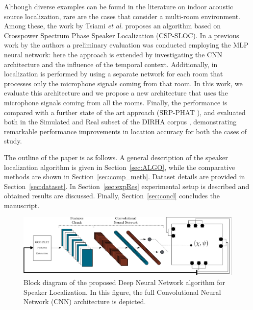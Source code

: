\documentclass[review]{elsarticle}
\newcommand{\secref}[1]{Section~\ref{#1}}
\begin{document}
Although diverse examples can be found in the literature on indoor acoustic source localization, rare are the cases that consider a multi-room environment. Among these, the work by Tsiami \textit{et al.} \cite{tsiami2014experiments} proposes an algorithm based on Crosspower Spectrum Phase Speaker Localization (CSP-SLOC). 
In a previous work by the authors \cite{vesperini2016sloc} a preliminary evaluation was conducted employing the MLP neural network: here the approach is extended by investigating the CNN architecture and the influence of the temporal context. Additionally, in \cite{vesperini2016sloc} localization is performed by using a separate network for each room that processes only the microphone signals coming from that room. In this work, we evaluate this architecture and we propose a new architecture that uses the microphone signals coming from all the rooms. Finally, the performance is compared with a further state of the art approach (SRP-PHAT \cite{DoSY07}), and evaluated both in the Simulated and Real subset of the DIRHA corpus \cite{cristoforetti2014dirha}, demonstrating remarkable performance improvements in location accuracy for both the cases of study.


The outline of the paper is as follows. A general description of the speaker localization algorithm is given in  \secref{sec:ALGO}, while the comparative methods are shown in \secref{sec:comp_meth}. Dataset details are provided in \secref{sec:dataset}. In \secref{sec:expRes} experimental setup is described and obtained results are discussed.
Finally, \secref{sec:concl} concludes the manuscript.

\begin{figure}[t]
	\centering
	\includegraphics[width=\textwidth]{imgs/alg_2}
	\caption{Block diagram of the proposed Deep Neural Network algorithm for Speaker Localization. 	In this figure, the full Convolutional Neural Network (CNN) architecture is depicted.}
	\label{fig:proposed_method}
\end{figure}
\end{document}
